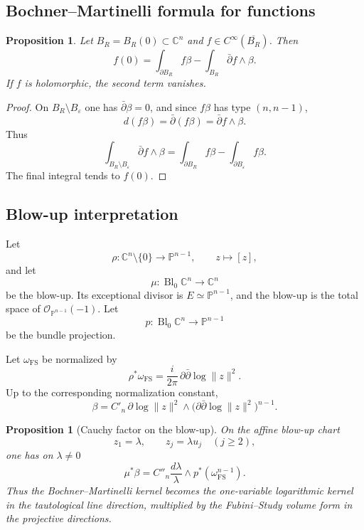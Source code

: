 \documentclass[11pt,a4paper]{article}
\newtheorem{proposition}[theorem]{Proposition}
\theoremstyle{definition}
\theoremstyle{remark}
\newcommand{\C}{\mathbb C}
\newcommand{\PP}{\mathbb P}
\newcommand{\ddbar}{\bar\partial}
\begin{document}
\subsection{Bochner--Martinelli formula for functions}

\begin{proposition}
Let $B_R=B_R(0)\subset\C^n$ and $f\in C^\infty(\overline{B_R})$. Then
\[
f(0)=\int_{\partial B_R}f\beta-\int_{B_R}\ddbar f\wedge\beta.
\]
If $f$ is holomorphic, the second term vanishes.
\end{proposition}

\begin{proof}
On $B_R\setminus B_\varepsilon$ one has $\ddbar\beta=0$, and since $f\beta$ has type $(n,n-1)$,
\[
d(f\beta)=\ddbar(f\beta)=\ddbar f\wedge\beta.
\]
Thus
\[
\int_{B_R\setminus B_\varepsilon}\ddbar f\wedge\beta
=\int_{\partial B_R}f\beta-\int_{\partial B_\varepsilon}f\beta.
\]
The final integral tends to $f(0)$.
\end{proof}

\subsection{Blow-up interpretation}

Let
\[
\rho:\C^n\setminus\{0\}\to\PP^{n-1},\qquad z\mapsto[z],
\]
and let
\[
\mu:\operatorname{Bl}_0\C^n\to\C^n
\]
be the blow-up. Its exceptional divisor is $E\simeq\PP^{n-1}$, and the blow-up is the total space of $\mathcal O_{\PP^{n-1}}(-1)$. Let
\[
p:\operatorname{Bl}_0\C^n\to\PP^{n-1}
\]
be the bundle projection.

Let $\omega_{\mathrm{FS}}$ be normalized by
\[
\rho^*\omega_{\mathrm{FS}}
=\frac{i}{2\pi}\,\partial\ddbar\log\|z\|^2.
\]
Up to the corresponding normalization constant,
\[
\beta=C'_n\,\partial\log\|z\|^2\wedge
\bigl(\partial\ddbar\log\|z\|^2\bigr)^{n-1}.
\]

\begin{proposition}[Cauchy factor on the blow-up]
On the affine blow-up chart
\[
z_1=\lambda,\qquad z_j=\lambda u_j\quad(j\ge2),
\]
one has on $\lambda\ne0$
\[
\mu^*\beta=C''_n\frac{d\lambda}{\lambda}
\wedge p^*(\omega_{\mathrm{FS}}^{n-1}).
\]
Thus the Bochner--Martinelli kernel becomes the one-variable logarithmic kernel in the tautological line direction, multiplied by the Fubini--Study volume form in the projective directions.
\end{proposition}
\end{document}
